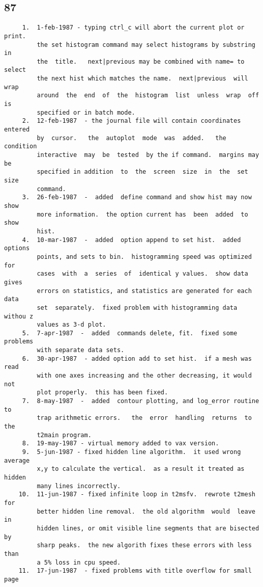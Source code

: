 \subsection{87}
\begin{verbatim}
     1.  1-feb-1987 - typing ctrl_c will abort the current plot or print.
         the set histogram command may select histograms by substring  in
         the  title.   next|previous may be combined with name= to select
         the next hist which matches the name.  next|previous  will  wrap
         around  the  end  of  the  histogram  list  unless  wrap  off is
         specified or in batch mode.  
     2.  12-feb-1987  - the journal file will contain coordinates entered
         by  cursor.   the  autoplot  mode  was  added.   the   condition
         interactive  may  be  tested  by the if command.  margins may be
         specified in addition  to  the  screen  size  in  the  set  size
         command.  
     3.  26-feb-1987  -  added  define command and show hist may now show
         more information.  the option current has  been  added  to  show
         hist.  
     4.  10-mar-1987  -  added  option append to set hist.  added options
         points, and sets to bin.  histogramming speed was optimized  for
         cases  with  a  series  of  identical y values.  show data gives
         errors on statistics, and statistics are generated for each data
         set  separately.  fixed problem with histogramming data withou z
         values as 3-d plot.  
     5.  7-apr-1987  -  added  commands delete, fit.  fixed some problems
         with separate data sets.  
     6.  30-apr-1987  - added option add to set hist.  if a mesh was read
         with one axes increasing and the other decreasing, it would  not
         plot properly.  this has been fixed.  
     7.  8-may-1987  -  added  contour plotting, and log_error routine to
         trap arithmetic errors.   the  error  handling  returns  to  the
         t2main program.  
     8.  19-may-1987 - virtual memory added to vax version.  
     9.  5-jun-1987 - fixed hidden line algorithm.  it used wrong average
         x,y to calculate the vertical.  as a result it treated as hidden
         many lines incorrectly.  
    10.  11-jun-1987 - fixed infinite loop in t2msfv.  rewrote t2mesh for
         better hidden line removal.  the old algorithm  would  leave  in
         hidden lines, or omit visible line segments that are bisected by
         sharp peaks.  the new algorith fixes these errors with less than
         a 5% loss in cpu speed.  
    11.  17-jun-1987  - fixed problems with title overflow for small page

\end{verbatim}
